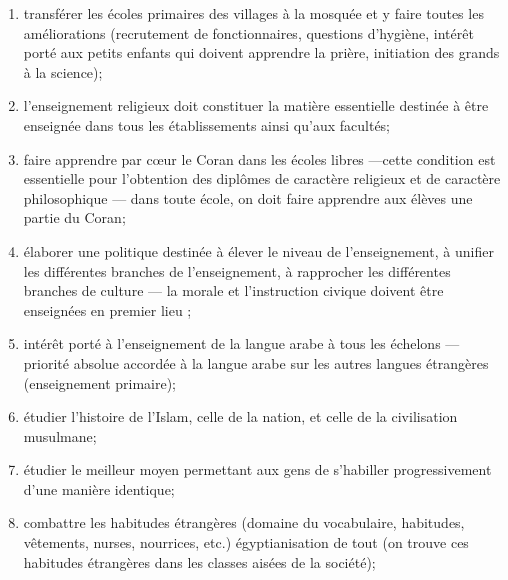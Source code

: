 \begin{enumerate}
\item
   
  transférer les écoles primaires des villages à la mosquée et y faire
  toutes les améliorations (recrutement de fonctionnaires, questions
  d'hygiène, intérêt porté aux petits enfants qui doivent apprendre la
  prière, initiation des grands à la science);
   
\item
   
  l'enseignement religieux doit constituer la matière essen­tielle
  destinée à être enseignée dans tous les établissements ainsi qu'aux
  facultés;
   
\item
   
  faire apprendre par cœur le Coran dans les écoles libres ---cette
  condition est essentielle pour l'obtention des diplômes de caractère
  religieux et de caractère philosophique --- dans toute école, on doit
  faire apprendre aux élèves une partie du Coran;
   
\item
   
  élaborer une politique destinée à élever le niveau de l'enseignement,
  à unifier les différentes branches de l'enseignement, à rapprocher les
  différentes branches de culture --- la morale et l'instruction civique
  doivent être enseignées en premier lieu ;
   
\item
   
  intérêt porté à l'enseignement de la langue arabe à tous les échelons
  --- priorité absolue accordée à la langue arabe sur les autres langues
  étrangères (enseignement primaire);
   
\item
   
  étudier l'histoire de l'Islam, celle de la nation, et celle de la
  civilisation musulmane;
   
\item
   
  étudier le meilleur moyen permettant aux gens de s'ha­biller
  progressivement d'une manière identique;
   
\item
   
  combattre les habitudes étrangères (domaine du voca­bulaire,
  habitudes, vêtements, nurses, nourrices, etc.) égyptiani­sation de
  tout (on trouve ces habitudes étrangères dans les classes aisées de la
  société);
   

\end{enumerate}
